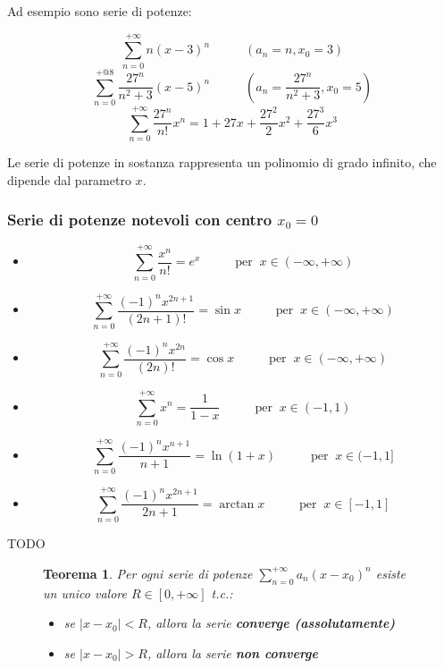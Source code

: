 \documentclass[a4paper]{article}
\newtheorem{theorem}{Teorema}
\theoremstyle{break}
\theoremstyle{break}
\theoremstyle{break}
\theoremstyle{break}
\begin{document}
Ad esempio sono serie di potenze:
\begin{figure}[H]
  \begin{example}
    \[
      \sum_{n=0}^{+\infty} n(x-3)^n \;\;\;\;\;\;\;\;\;\; (a_n=n, x_0=3)
    \] 
    \[
      \sum_{n=0}^{+@8} \frac{27^n}{n^2+3}(x-5)^n \;\;\;\;\;\;\;\;\;\; (a_n = \frac{27^n}{n^2+3}, x_0=5)
    \] 
    \[
      \sum_{n=0}^{+\infty} \frac{27^n}{n!}x^n = 1+27x+\frac{27^2}{2}x^2+\frac{27^3}{6}x^3
    \] 
  \end{example}
\end{figure}
Le serie di potenze in sostanza rappresenta un polinomio di grado infinito, che dipende dal parametro \( x \).
\subsubsection{Serie di potenze notevoli con centro \( x_0 = 0 \)}
\begin{itemize}
  \item \[
      \sum_{n=0}^{+\infty} \frac{x^n}{n!} = e^x \;\;\;\;\;\;\;\;\;\; \text{per}\;\; x \in (-\infty, +\infty)
    \] 
  \item \[
      \sum_{n=0}^{+\infty} \frac{(-1)^nx^{2n+1}}{(2n+1)!} = \sin x \;\;\;\;\;\;\;\;\;\; \text{per}\;\; x \in (-\infty, +\infty)
    \] 
  \item \[
      \sum_{n=0}^{+\infty} \frac{(-1)^nx^{2n}}{(2n)!} = \cos x \;\;\;\;\;\;\;\;\;\; \text{per}\;\; x \in (-\infty, +\infty)
    \] 
  \item \[
      \sum_{n=0}^{+\infty} x^n = \frac{1}{1-x} \;\;\;\;\;\;\;\;\;\; \text{per}\;\; x \in (-1, 1)
    \] 
  \item \[
      \sum_{n=0}^{+\infty} \frac{(-1)^nx^{n+1}}{n+1} = \ln(1+x) \;\;\;\;\;\;\;\;\;\; \text{per}\;\; x \in (-1, 1]
    \] 
  \item \[
      \sum_{n=0}^{+\infty} \frac{(-1)^n x^{2n+1}}{2n+1} = \arctan x \;\;\;\;\;\;\;\;\;\; \text{per}\;\; x \in [-1, 1]
    \] 
\end{itemize}
TODO
\begin{figure}[H]
  \begin{theorem}
    Per ogni serie di potenze \( \sum_{n=0}^{+\infty} a_n(x-x_0)^n \) esiste un unico valore \( R \in [0, +\infty] \) t.c.:
    \begin{itemize}
      \item se \( |x-x_0| < R \), allora la serie \textbf{converge (assolutamente)}
      \item se \( |x-x_0| > R \), allora la serie \textbf{non converge}
    \end{itemize}
    \label{D2}
    \label{Teorema del raggio di convergenza}
  \end{theorem}
\end{figure}
\end{document}
